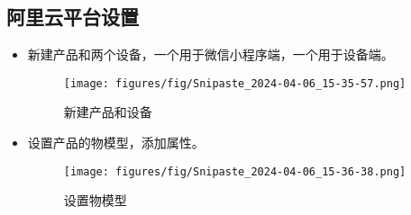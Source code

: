 \documentclass[12pt,hyperref,a4paper,UTF8]{ctexart}
\begin{document}
\subsection{阿里云平台设置}
\begin{itemize}[itemsep=-5pt, topsep=0pt, partopsep=0pt]
    \item 新建产品和两个设备，一个用于微信小程序端，一个用于设备端。
    \begin{figure}[H]
      \centering
      \texttt{[image: figures/fig/Snipaste\_2024-04-06\_15-35-57.png]}
      \caption{新建产品和设备}
      \label{fig:enter-label}
    \end{figure}
    \item 设置产品的物模型，添加属性。
    \begin{figure}[H]
      \centering
      \texttt{[image: figures/fig/Snipaste\_2024-04-06\_15-36-38.png]}
      \caption{设置物模型}
      \label{fig:enter-label}
    \end{figure}
    

\end{itemize}
\end{document}
